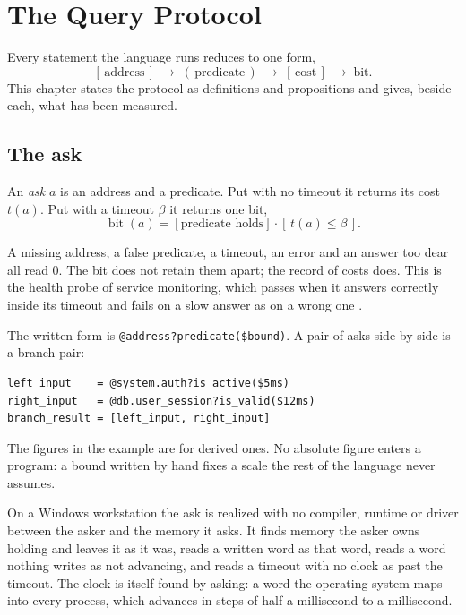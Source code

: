 \chapter{The Query Protocol}
\label{ch:protocol}

Every statement the language runs reduces to one form,
\[
  [\,\text{address}\,] \;\to\; (\,\text{predicate}\,) \;\to\; [\,\text{cost}\,] \;\to\; \text{bit}.
\]
This chapter states the protocol as definitions and propositions and gives, beside each, what has
been measured.

\section{The ask}

\begin{definition}[Ask]
An \emph{ask} \(a\) is an address and a predicate. Put with no timeout it returns its cost
\(t(a)\). Put with a timeout \(\beta\) it returns one bit,
\[
  \operatorname{bit}(a) = [\text{predicate holds}] \cdot [\,t(a) \le \beta\,].
\]
\end{definition}

A missing address, a false predicate, a timeout, an error and an answer too dear all read 0. The
bit does not retain them apart; the record of costs does. This is the health probe of service
monitoring, which passes when it answers correctly inside its timeout and fails on a slow answer
as on a wrong one \cite{src:Kubernetes-probes}.

The written form is \texttt{@address?predicate(\$bound)}. A pair of asks side by side is a branch
pair:
\begin{verbatim}
left_input    = @system.auth?is_active($5ms)
right_input   = @db.user_session?is_valid($12ms)
branch_result = [left_input, right_input]
\end{verbatim}
The figures in the example are for derived ones. No absolute figure enters a program: a bound
written by hand fixes a scale the rest of the language never assumes.

On a Windows workstation the ask is realized with no compiler, runtime or driver between the
asker and the memory it asks. It finds memory the asker owns holding and leaves it as it was,
reads a written word as that word, reads a word nothing writes as not advancing, and reads a
timeout with no clock as past the timeout. The clock is itself found by asking: a word the
operating system maps into every process, which advances in steps of half a millisecond to a
millisecond.

